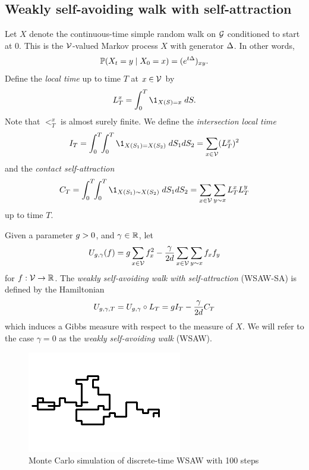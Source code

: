 
\subsection{Weakly self-avoiding walk with self-attraction}

Let $X$ denote the continuous-time simple random walk on $\mathcal{G}$ conditioned
to start at $0$. This is the $\mathcal{V}$-valued Markov process $X$ with generator
$\Delta$. In other words,
\begin{equation}
\operatorname{\mathbb{P}}(X_t = y \mid X_0 = x) = (e^{t \Delta})_{xy}.
\end{equation}
Define the \emph{local time} up to time $T$
at $x \in \mathcal{V}$ by
\begin{equation}
\label{e:LTx-def}
\lt^x_T = \int_0^T \1_{X(S)=x} \; dS.
\end{equation}
Note that $\lt^x_T$ is almost surely finite. We define the \emph{intersection
local time}
\begin{equation}
\label{e:ITdef}
I_T
	=
\int_0^T \!\! \int_0^T \1_{X(S_1)=X(S_2)} \; dS_1 dS_2
	=
\sum_{x\in\vertices} (\lt^x_T)^2
\end{equation}
and the \emph{contact self-attraction}
\begin{equation}
\label{e:CTdef}
C_T
	=
\int_0^T \!\! \int_0^T \1_{X(S_1) \sim X(S_2)} \; dS_1 dS_2
	=
\sum_{x \in \vertices} \sum_{y \sim x} \lt_T^x \lt_T^y
\end{equation}
up to time $T$.

Given a parameter $g > 0$, and $\gamma \in {\mathbb R}$, let
\begin{equation}
\label{e:Udef-neg}
U_{g,\gamma}(f)
=
g \sum_{x\in\mathcal{V}} f_x^2
- \frac{\gamma}{2d}
\sum_{x\in\mathcal{V}} \sum_{y \sim x} f_x f_y
\end{equation}
for $f : \mathcal{V} \rightarrow {\mathbb R}$.
The \emph{weakly self-avoiding walk with self-attraction} (WSAW-SA) is defined
by the Hamiltonian
\begin{equation}
\label{e:V}
U_{g,\gamma,T}
	= U_{g,\gamma} \circ L_T
	= g I_T - \frac{\gamma}{2 d} C_T
\end{equation}
which induces a Gibbs measure with respect to the measure of $X$.
We will refer to the case $\gamma = 0$ as the \emph{weakly self-avoiding walk} (WSAW).

\begin{figure}[!htb]
\centering
\label{fig:domb-joyce}
\includegraphics{domb-joyce-black-small.png}
\caption[Discrete WSAW]{Monte Carlo simulation of discrete-time WSAW with 100 steps}
\end{figure}

